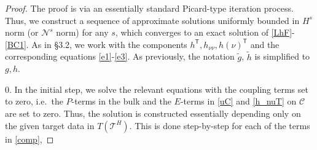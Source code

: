\documentclass[10pt]{amsart}
\newcommand{\cC}{{\mathcal C}}
\newcommand{\cT}{{\mathcal T}}
\newcommand{\cN}{{\mathcal N}}
\newcommand{\tT}{\mathsf{T}}
\newcommand{\<}{\langle}
\renewcommand{\>}{\rangle}
\newcommand{\w}{\widetilde}
\theoremstyle{plain}
\theoremstyle{remark}
\theoremstyle{definition}
\numberwithin{equation}{section}
\begin{document}
 \begin{proof} 
The proof is via an essentially standard Picard-type iteration process. Thus, we construct a sequence of approximate solutions uniformly bounded in 
$H^s$ norm (or $\cN^s$ norm) for any $s$, which converges to an exact solution of \eqref{LhF}-\eqref{BC1}. As in \S 3.2, we work with the components 
$h^{\tT}, h_{\nu\nu}, h(\nu)^{\tT}$ and the corresponding equations \eqref{e1}-\eqref{e3}. As previously, the notation $\w g$, $\w h$ is simplified to 
$g, h$. 
    
\medskip 


0. In the initial step, we solve the relevant equations with the coupling terms set to zero, i.e.~the $P$-terms in the bulk and the $E$-terms in \eqref{uC} and \eqref{h_nuT} 
on $\cC$ are set to zero. Thus, the solution is constructed essentially depending only on the given target data in $T(\cT^H)$. This is done step-by-step 
for each of the terms in \eqref{comp}, 


\end{proof}
\end{document}
